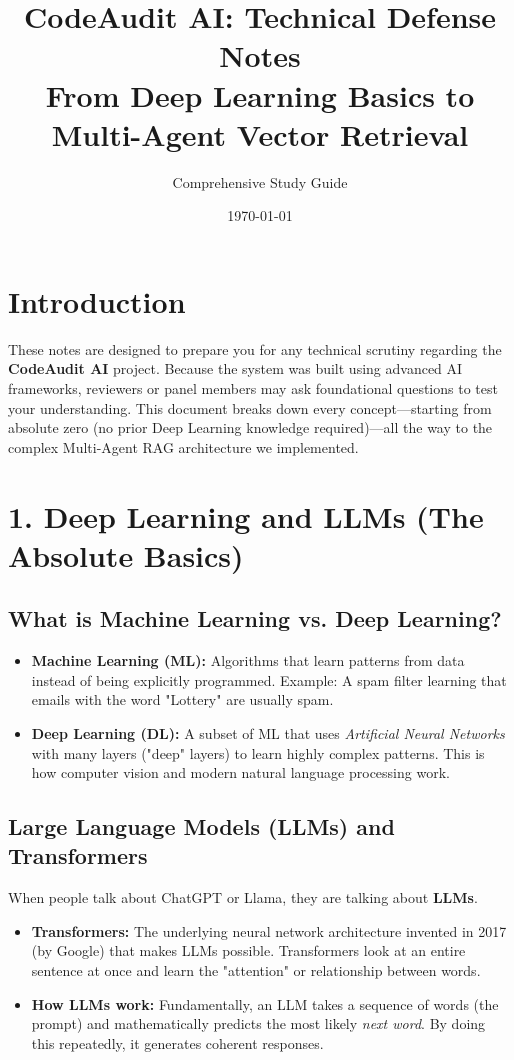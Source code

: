 \documentclass[12pt,a4paper]{article}
\title{\Huge \textbf{CodeAudit AI: Technical Defense Notes} \\ 
\Large From Deep Learning Basics to Multi-Agent Vector Retrieval}
\author{Comprehensive Study Guide}
\date{\today}
\begin{document}
\maketitle
\tableofcontents
\newpage

\section{Introduction}
These notes are designed to prepare you for any technical scrutiny regarding the \textbf{CodeAudit AI} project. Because the system was built using advanced AI frameworks, reviewers or panel members may ask foundational questions to test your understanding. This document breaks down every concept—starting from absolute zero (no prior Deep Learning knowledge required)—all the way to the complex Multi-Agent RAG architecture we implemented.

\section{1. Deep Learning and LLMs (The Absolute Basics)}
\subsection{What is Machine Learning vs. Deep Learning?}
\begin{itemize}
    \item \textbf{Machine Learning (ML):} Algorithms that learn patterns from data instead of being explicitly programmed. Example: A spam filter learning that emails with the word "Lottery" are usually spam.
    \item \textbf{Deep Learning (DL):} A subset of ML that uses \textit{Artificial Neural Networks} with many layers ("deep" layers) to learn highly complex patterns. This is how computer vision and modern natural language processing work.
\end{itemize}

\subsection{Large Language Models (LLMs) and Transformers}
When people talk about ChatGPT or Llama, they are talking about \textbf{LLMs}.
\begin{itemize}
    \item \textbf{Transformers:} The underlying neural network architecture invented in 2017 (by Google) that makes LLMs possible. Transformers look at an entire sentence at once and learn the "attention" or relationship between words.
    \item \textbf{How LLMs work:} Fundamentally, an LLM takes a sequence of words (the prompt) and mathematically predicts the most likely \textit{next word}. By doing this repeatedly, it generates coherent responses.
\end{itemize}
\end{document}

